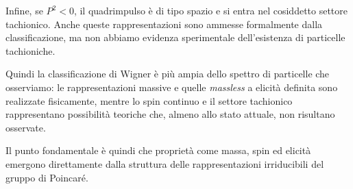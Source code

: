 \documentclass[10pt,a4paper]{article}
\begin{document}
Infine, se $P^2 < 0$, il quadrimpulso è di tipo spazio e si entra nel
cosiddetto settore tachionico. Anche queste rappresentazioni sono
ammesse formalmente dalla classificazione, ma non abbiamo evidenza
sperimentale dell'esistenza di particelle tachioniche.

Quindi la classificazione di Wigner è più ampia dello spettro di
particelle che osserviamo: le rappresentazioni massive e quelle
\emph{massless} a elicità definita sono realizzate fisicamente,
mentre lo spin continuo e il settore tachionico rappresentano
possibilità teoriche che, almeno allo stato attuale, non risultano
osservate.

Il punto fondamentale è quindi che proprietà come massa, spin ed
elicità emergono direttamente dalla struttura delle
rappresentazioni irriducibili del gruppo di Poincaré.
\end{document}
